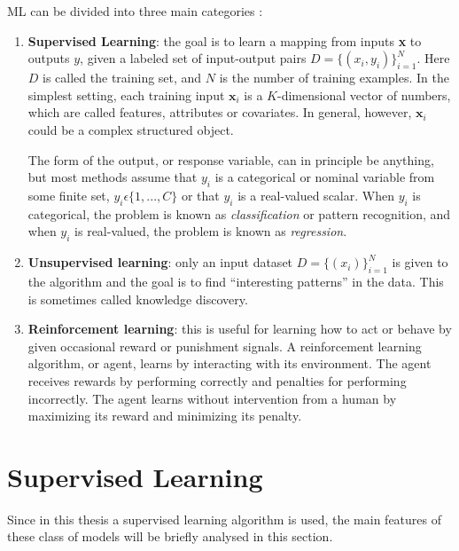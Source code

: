 \documentclass[a4paper, oneside, 11pt, openright]{book}
\begin{document}
		ML can be divided into three main categories \cite{ML categories}:
		\begin{enumerate}
			\item \textbf{Supervised Learning}: the goal is to learn a mapping from inputs \textbf{x} to outputs $y$, given a labeled set of input-output pairs $D = \{(x_i, y_i)\}_{i=1}^{N}$. Here $D$ is called the training set, and $N$ is the number of training examples. In the simplest setting, each training input $\textbf{x}_i$ is a $K$-dimensional vector of numbers, which are called features, attributes or covariates. In general, however, $\textbf{x}_i$ could be a complex structured object.
			
			The form of the output, or response variable, can in principle be anything, but most methods assume that $y_i$ is a categorical or nominal variable from some finite set, $y_i \epsilon  \{1, . . . , C\}$ or that $y_i$ is a real-valued scalar. When $y_i$ is categorical, the problem is known as \textit{classification} or pattern recognition, and when $y_i$ is real-valued, the problem is known as \textit{regression}.
			
			\item \textbf{Unsupervised learning}: only an input dataset $D = \{(x_i)\}_{i=1}^{N}$ is given to the algorithm and the goal is to find “interesting patterns” in the data. This is sometimes called knowledge discovery. %
			
			\item \textbf{Reinforcement learning}: this is useful for learning how to act or behave by given occasional reward or punishment signals. A reinforcement learning algorithm, or agent, learns by interacting with its environment. The agent receives rewards by performing correctly and penalties for performing incorrectly. The agent learns without intervention from a human by maximizing its reward and minimizing its penalty.
			
		\end{enumerate}
		\section{Supervised Learning}
		Since in this thesis a supervised learning algorithm \cite{GBT} is used, the main features of these class of models will be briefly analysed in this section.
\end{document}
